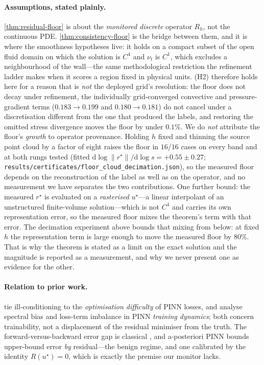 \paragraph{Assumptions, stated plainly.} \autoref{thm:residual-floor} is about the
\emph{monitored discrete} operator $R_h$, not the continuous PDE.
\autoref{thm:consistency-floor} is the bridge between them, and it is where the smoothness
hypotheses live: it holds on a compact subset of the open fluid domain on which the
solution is $C^4$ and $\nu_t$ is $C^1$, which excludes a neighbourhood of the wall---the
same methodological restriction the refinement ladder makes when it scores a region fixed
in physical units. (H2) therefore holds here for a reason that is \emph{not} the deployed
grid's resolution: the floor does not decay under refinement, the individually
grid-converged convective and pressure-gradient terms
($0.183\!\to\!0.199$ and $0.180\!\to\!0.181$) do not cancel under a discretisation
different from the one that produced the labels, and restoring the omitted stress
divergence moves the floor by under $0.1\%$. We do \emph{not} attribute the floor's
\emph{growth} to operator provenance. Holding $h$ fixed and thinning the source point
cloud by a factor of eight raises the floor in $16/16$ cases on every band and at both
rungs tested (fitted $\mathrm{d}\log\|r^\star\|/\mathrm{d}\log s=+0.55\pm0.27$;
\texttt{results/certificates/floor\_cloud\_decimation.json}), so the measured floor
depends on the reconstruction of the label as well as on the operator, and no
measurement we have separates the two contributions. One further bound: the measured
$r^\star$ is evaluated on a \emph{rasterised} $u^\star$---a linear interpolant of an
unstructured finite-volume solution---which is not $C^4$ and carries its own
representation error, so the measured floor mixes the theorem's term with that error. The
decimation experiment above bounds that mixing from below: at fixed $h$ the
representation term is large enough to move the measured floor by $80\%$. That
is why the theorem is stated as a limit on the exact solution and the magnitude is reported
as a measurement, and why we never present one as evidence for the other.

\paragraph{Relation to prior work.} \citet{krishnapriyan2021failure} tie ill-conditioning
to the \emph{optimisation difficulty} of PINN losses, and \citet{wang2022ntk} analyse
spectral bias and loss-term imbalance in PINN \emph{training dynamics}; both concern
trainability, not a displacement of the residual minimiser from the truth. The
forward-versus-backward error gap is classical \citep{trefethenbau1997}, and a-posteriori
PINN bounds upper-bound error \emph{by} residual---the benign regime, and one calibrated by
the identity $R(u^\star)=0$, which is exactly the premise our monitor lacks.

